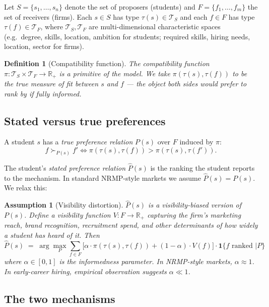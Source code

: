 \documentclass[11pt,a4paper]{article}
\newtheorem{assumption}{Assumption}
\newtheorem{definition}{Definition}
\newcommand{\R}{\mathbb{R}}
\newcommand{\TT}{\mathcal{T}}
\newcommand{\bone}{\mathbf{1}}
\begin{document}
Let $S = \{s_1, \dots, s_n\}$ denote the set of proposers (students) and $F = \{f_1, \dots, f_m\}$ the set of receivers (firms). Each $s \in S$ has type $\tau(s) \in \TT_S$ and each $f \in F$ has type $\tau(f) \in \TT_F$, where $\TT_S, \TT_F$ are multi-dimensional characteristic spaces (e.g.\ degree, skills, location, ambition for students; required skills, hiring needs, location, sector for firms).

\begin{definition}[Compatibility function]
\label{def:pi}
The compatibility function $\pi: \TT_S \times \TT_F \to \R_+$ is a primitive of the model. We take $\pi(\tau(s),\tau(f))$ to be the true measure of fit between $s$ and $f$ --- the object both sides would prefer to rank by if fully informed.
\end{definition}

\subsection{Stated versus true preferences}

A student $s$ has a \emph{true preference relation} $P(s)$ over $F$ induced by $\pi$:
\[
    f \succ_{P(s)} f' \iff \pi(\tau(s),\tau(f)) > \pi(\tau(s),\tau(f')).
\]

The student's \emph{stated preference relation} $\widehat{P}(s)$ is the ranking the student reports to the mechanism. In standard NRMP-style markets we assume $\widehat{P}(s) = P(s)$. We relax this:

\begin{assumption}[Visibility distortion]
\label{ass:distortion}
$\widehat{P}(s)$ is a visibility-biased version of $P(s)$. Define a visibility function $V: F \to \R_+$ capturing the firm's marketing reach, brand recognition, recruitment spend, and other determinants of how widely a student has heard of it. Then
\[
    \widehat{P}(s) \;=\; \arg\max_{P} \sum_{f \in F}
    \Big[ \alpha \cdot \pi(\tau(s),\tau(f)) + (1-\alpha) \cdot V(f) \Big] \cdot \bone\{f \text{ ranked } | P\}
\]
where $\alpha \in [0,1]$ is the \emph{informedness parameter}. In NRMP-style markets, $\alpha \approx 1$. In early-career hiring, empirical observation suggests $\alpha \ll 1$.
\end{assumption}

\subsection{The two mechanisms}
\end{document}
